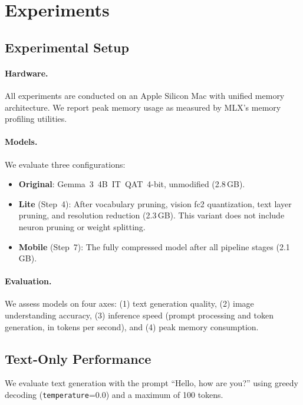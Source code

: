 \documentclass[11pt]{article}
\begin{document}
\section{Experiments}
\label{sec:experiments}

\subsection{Experimental Setup}

\paragraph{Hardware.} All experiments are conducted on an Apple Silicon Mac with unified memory architecture. We report peak memory usage as measured by MLX's memory profiling utilities.

\paragraph{Models.} We evaluate three configurations:
\begin{itemize}[leftmargin=*]
    \item \textbf{Original}: Gemma~3~4B~IT~QAT~4-bit, unmodified (2.8\,GB).
    \item \textbf{Lite} (Step~4): After vocabulary pruning, vision fc2 quantization, text layer pruning, and resolution reduction (2.3\,GB). This variant does not include neuron pruning or weight splitting.
    \item \textbf{Mobile} (Step~7): The fully compressed model after all pipeline stages (2.1\,GB).
\end{itemize}

\paragraph{Evaluation.} We assess models on four axes: (1) text generation quality, (2) image understanding accuracy, (3) inference speed (prompt processing and token generation, in tokens per second), and (4) peak memory consumption.

\subsection{Text-Only Performance}

We evaluate text generation with the prompt ``Hello, how are you?'' using greedy decoding (\texttt{temperature}=0.0) and a maximum of 100 tokens.
\end{document}
